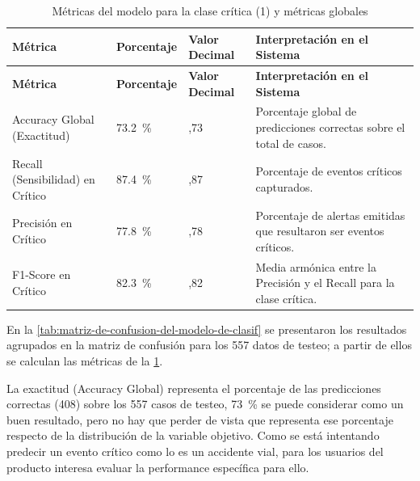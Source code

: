 \begin{longtable}[]{@{}
>{\raggedright\arraybackslash}p{}
  >{\centering\arraybackslash}p{}
  >{\centering\arraybackslash}p{}
  >{\raggedright\arraybackslash}p{}@{}}
\caption{Métricas del modelo para la clase crítica (1) y métricas globales}
\label{tab:metricas-del-modelo-de-clasificacion-par}\\
\toprule\noalign{}
\textbf{Métrica} & \textbf{Porcentaje} & \textbf{Valor Decimal} & \textbf{Interpretación en el Sistema} \\
\midrule\noalign{}
\endfirsthead
\toprule\noalign{}
\textbf{Métrica} & \textbf{Porcentaje} & \textbf{Valor Decimal} & \textbf{Interpretación en el Sistema} \\
\midrule\noalign{}
\endhead
\bottomrule\noalign{}
\endlastfoot
Accuracy Global (Exactitud) & \qty{73.2}{\percent} & 0,73 & Porcentaje global de predicciones correctas sobre el total de casos. \\
Recall (Sensibilidad) en Crítico & \qty{87.4}{\percent} & 0,87 & Porcentaje de eventos críticos capturados. \\
Precisión en Crítico & \qty{77.8}{\percent} & 0,78 & Porcentaje de alertas emitidas que resultaron ser eventos críticos. \\
F1-Score en Crítico & \qty{82.3}{\percent} & 0,82 & Media armónica entre la Precisión y el Recall para la clase crítica. \\
\end{longtable}


En la \cref{tab:matriz-de-confusion-del-modelo-de-clasif} se presentaron los resultados agrupados en la matriz de confusión para los 557 datos de testeo; a partir de ellos se calculan las métricas de la \cref{tab:metricas-del-modelo-de-clasificacion-par}.

La exactitud (Accuracy Global) representa el porcentaje de las predicciones correctas (408) sobre los 557 casos de testeo, \qty{73}{\percent} se puede considerar como un buen resultado, pero no hay que perder de vista que representa ese porcentaje respecto de la distribución de la variable objetivo. Como se está intentando predecir un evento crítico como lo es un accidente vial, para los usuarios del producto interesa evaluar la performance específica para ello.

